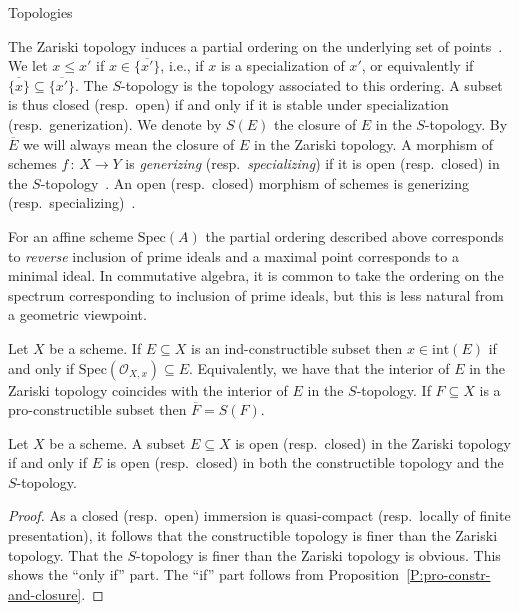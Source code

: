 \documentclass[a4paper,twoside,11pt]{amsart}[2009/07/02] %
\newcommand{\pref}[1]{\eqref{#1}}
\newcommand{\map}[3]{#1\,:\, #2\rightarrow #3}
\newcommand{\Spec}{\mathrm{Spec}}
\newcommand\sO{\mathcal{O}} %
\newcommand{\interior}{\mathrm{int}}
\begin{document}
\begin{section}{Topologies}

The Zariski topology induces a partial ordering on the underlying set of
points~\cite[2.1.1]{egaI_NE}. We let $x\leq x'$ if $x\in \overline{\{x'\}}$,
i.e., if $x$ is a specialization of $x'$, or equivalently if
$\overline{\{x\}}\subseteq\overline{\{x'\}}$. The $S$-topology is the topology
associated to this ordering. A subset is thus closed (resp.\ open) if and only
if it is stable under specialization (resp.\ generization). We denote by $S(E)$
the closure of $E$ in the $S$-topology. By $\overline{E}$ we will always mean
the closure of $E$ in the Zariski topology. A morphism of schemes
$\map{f}{X}{Y}$ is \emph{generizing} (resp.\ \emph{specializing})
if it is open (resp.\ closed) in the $S$-topology~\cite[\S3.9]{egaI_NE}.
An open (resp.\ closed) morphism of schemes is generizing (resp.\
specializing)~\cite[Prop.~3.9.3]{egaI_NE}.

\begin{remark}
For an affine scheme $\Spec(A)$ the partial ordering described above
corresponds to \emph{reverse} inclusion of prime ideals and a maximal point
corresponds to a minimal ideal. In commutative algebra, it is common to take
the ordering on the spectrum corresponding to inclusion of prime ideals, but
this is less natural from a geometric viewpoint.
\end{remark}

\begin{proposition}
\label{P:pro-constr-and-closure}
Let $X$ be a scheme. If $E\subseteq X$ is an ind-constructible subset then
$x\in \interior(E)$ if and only if $\Spec(\sO_{X,x})\subseteq E$. Equivalently,
we have that the interior of $E$ in the Zariski topology coincides with the
interior of $E$ in the $S$-topology. If $F\subseteq X$ is a pro-constructible
subset then $\overline{F}=S(F)$.
\end{proposition}

\begin{corollary}\label{C:constr+S<=>Zariski}
Let $X$ be a scheme. A subset $E\subseteq X$ is open (resp.\ closed) in the
Zariski topology if and only if $E$ is open (resp.\ closed) in both the
constructible topology and the $S$-topology.
\end{corollary}
\begin{proof}
As a closed (resp.\ open) immersion is quasi-compact (resp.\ locally of finite
presentation),
it follows that
the constructible topology is finer than the Zariski topology. That the
$S$-topology is finer than the Zariski topology is obvious. This shows the
``only if'' part. The ``if'' part follows from
Proposition~\pref{P:pro-constr-and-closure}.
\end{proof}


\end{section}
\end{document}
